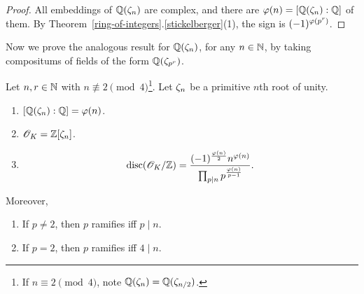 \begin{proof}
All embeddings of $\mathbb{Q}(\zeta_n)$ are complex, and there are $\varphi(n)=[\mathbb{Q}(\zeta_n):\mathbb{Q}]$ of them. By Theorem~\ref{ring-of-integers}.\ref{stickelberger}(1), the sign is $(-1)^{\varphi(p^r)}$.
\end{proof}
Now we prove the analogous result for $\mathbb{Q}(\zeta_{n})$, for any $n\in\mathbb{N}$, by taking compositums of fields of the form $\mathbb{Q}(\zeta_{p^r})$.
\begin{thm}
Let $n,r\in\mathbb{N}$ with $n\nequiv 2\pmod 4$\footnote{If $n\equiv 2\pmod{4}$, note $\mathbb{Q}(\zeta_n)=\mathbb{Q}(\zeta_{n/2})$.}. Let $\zeta_n$ be a primitive $n$th root of unity.
\begin{enumerate}
\item $[\mathbb{Q}(\zeta_n):\mathbb{Q}]=\varphi(n)$.
\item $\mathscr{O}_K=\mathbb{Z}[\zeta_{n}]$.
\item 
\[
\operatorname{disc}(\mathscr{O}_K/\mathbb{Z})=\frac{(-1)^{\frac{\varphi(n)}2}n^{\varphi(n)}}{\prod_{p\mid n} p^{\frac{\varphi(n)}{p-1}}}.
\]
\end{enumerate}
Moreover,
\begin{enumerate}
\item If $p\ne 2$, then $p$ ramifies iff $p\mid n$.
\item If $p=2$, then $p$ ramifies iff $4\mid n$.
\end{enumerate}
\end{thm}
